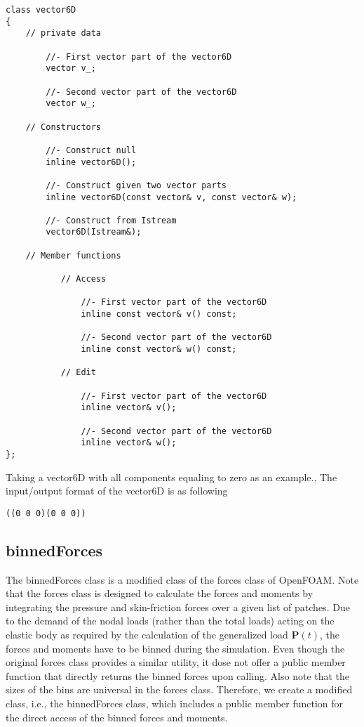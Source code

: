 \begin{lstlisting}
class vector6D
{
    // private data

        //- First vector part of the vector6D
        vector v_;

        //- Second vector part of the vector6D
        vector w_;

    // Constructors

        //- Construct null
        inline vector6D();

        //- Construct given two vector parts
        inline vector6D(const vector& v, const vector& w);

        //- Construct from Istream
        vector6D(Istream&);

    // Member functions

           // Access

               //- First vector part of the vector6D
               inline const vector& v() const;

               //- Second vector part of the vector6D
               inline const vector& w() const;
               
           // Edit

               //- First vector part of the vector6D
               inline vector& v();

               //- Second vector part of the vector6D
               inline vector& w();
};
\end{lstlisting}

\noindent Taking a vector6D with all components equaling to zero as an example., The input/output format of the vector6D is as following

\begin{lstlisting}
((0 0 0)(0 0 0))
\end{lstlisting}


\subsection{binnedForces}

The binnedForces class is a modified class of the forces class of OpenFOAM. Note that the forces class is designed to calculate the forces and moments by integrating the pressure and skin-friction forces over a given list of patches. Due to the demand of the nodal loads (rather than the total loads) acting on the elastic body as required by the calculation of the generalized load $\boldsymbol{P}(t)$, the forces and moments have to be binned during the simulation. Even though the original forces class provides a similar utility, it dose not offer a public member function that directly returns the binned forces upon calling. Also note that the sizes of the bins are universal in the forces class. Therefore, we create a modified class, i.e., the binnedForces class, which includes a public member function for the direct access of the binned forces and moments.

